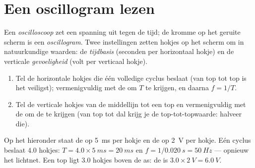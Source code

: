 \section{Een oscillogram lezen}

\begin{definition}[Oscilloscoop]\label{def:g10:signals-and-waves:oscilloscope}
Een \emph{oscilloscoop} zet een spanning uit tegen de
tijd; de kromme op het geruite scherm is een
\emph{oscillogram}. Twee instellingen zetten hokjes op
het scherm om in natuurkundige waarden: de
\emph{tijdbasis} (seconden per horizontaal hokje) en de
verticale \emph{gevoeligheid} (volt per verticaal
hokje).
\end{definition}

\begin{method}\label{met:g10:signals-and-waves:oscillogram}
\begin{enumerate}
  \item Tel de horizontale hokjes die één volledige cyclus beslaat (van
        top tot top is het veiligst); vermenigvuldig met de  om
        $T$ te krijgen, en daarna $f = 1/T$.
  \item Tel de verticale hokjes van de middellijn tot een top en
        vermenigvuldig met de  om de  te krijgen
        (van top tot dal krijg je de top-tot-topwaarde: halveer die).
\end{enumerate}
\end{method}

\begin{example}\label{ex:g10:signals-and-waves:reading}
Op het  hieronder staat de  op \qty{5}{ms} per hokje
en de  op \qty{2}{V} per hokje. Eén cyclus beslaat $4.0$
hokjes: $T = 4.0 \times \qty{5}{ms} = \qty{20}{ms}$ en
$f = 1/\qty{0.020}{s} = \qty{50}{Hz}$ --- opnieuw het lichtnet. Een top
ligt $3.0$ hokjes boven de as: de  is
$3.0 \times \qty{2}{V} = \qty{6.0}{V}$.
\end{example}

